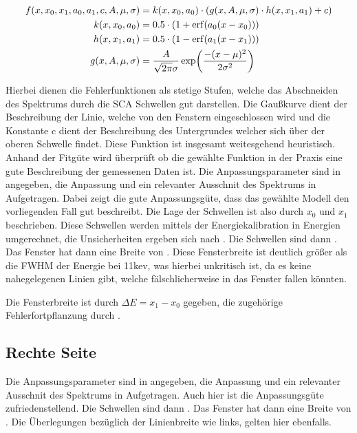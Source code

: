 \begin{align}
	f(x, x_0, x_1, a_0, a_1, c, A, \mu, \sigma) &= k(x, x_0, a_0) \cdot (g(x, A, \mu, \sigma) \cdot h(x, x_1, a_1) + c)\\
	k(x, x_0, a_0) &= 0.5 \cdot (1 + \erf(a_0 (x - x_0))) \\
	h(x, x_1, a_1) &= 0.5 \cdot (1 - \erf(a_1 (x - x_1))) \\
	g(x, A, \mu, \sigma) &= \frac{A}{\sqrt{2 \pi} \sigma} \exp(\frac{- (x - \mu)^2}{2 \sigma^2})
\end{align}

Hierbei dienen die Fehlerfunktionen\cite[11]{525va} als stetige Stufen, welche das Abschneiden des Spektrums durch die SCA Schwellen gut darstellen. Die Gaußkurve dient der Beschreibung der Linie, welche von den Fenstern eingeschlossen wird und die Konstante c dient der Beschreibung des Untergrundes welcher sich über der oberen Schwelle findet. Diese Funktion ist insgesamt weitesgehend heuristisch. Anhand der Fitgüte wird überprüft ob die gewählte Funktion in der Praxis eine gute Beschreibung der gemessenen Daten ist.
Die Anpassungsparameter sind in  angegeben, die Anpassung und ein relevanter Ausschnit des Spektrums in  Aufgetragen. Dabei zeigt die gute Anpassungsgüte, dass das gewählte Modell den vorliegenden Fall gut beschreibt.
Die Lage der Schwellen ist also durch $x_0$ und $x_1$ beschrieben. Diese Schwellen werden mittels der Energiekalibration in Energien umgerechnet, die Unsicherheiten ergeben sich nach . Die Schwellen sind dann . Das Fenster hat dann eine Breite von . Diese Fensterbreite ist deutlich größer als die FWHM der Energie bei \511kev, was hierbei unkritisch ist, da es keine nahegelegenen Linien gibt, welche fälschlicherweise in das Fenster fallen könnten.

Die Fensterbreite ist durch $\Delta E = x_1 - x_0$ gegeben, die zugehörige Fehlerfortpflanzung durch .


\subsection*{Rechte Seite}
Die Anpassungsparameter sind in  angegeben, die Anpassung und ein relevanter Ausschnit des Spektrums in  Aufgetragen. Auch hier ist die Anpassungsgüte zufriedenstellend.
Die Schwellen sind dann . Das Fenster hat dann eine Breite von . Die Überlegungen bezüglich der Linienbreite wie links, gelten hier ebenfalls.

